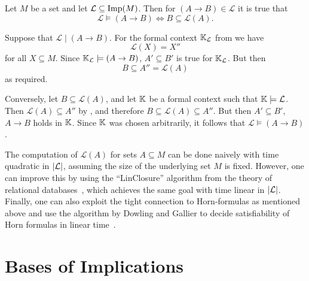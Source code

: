 \begin{Lemma}
  \label{lem:characterization-of-entailment-in-terms-of-induced-closure-operators}
  Let $M$ be a set and let $\mathcal{L} \subseteq \operatorname{Imp}(M)$.  Then for $(A \to B) \in
  \mathcal{L}$ it is true that
  \begin{equation}
    \label{eq:7}
    \mathcal{L} \models (A \to B) \iff B \subseteq \mathcal{L}(A).
  \end{equation}
\end{Lemma}
\begin{Proof}
  Suppose that $\mathcal{L} \mid (A \to B)$.  For the formal context ${\mathbb{K}}_{\mathcal{L}}$ from  we have
  \begin{equation*}
    \mathcal{L}(X) = X''
  \end{equation*}
  for all $X \subseteq M$.  Since ${\mathbb{K}}_{\mathcal{L}} \models (A \to B)$, $A' \subseteq
  B'$ is true for ${\mathbb{K}}_{\mathcal{L}}$.  But then
  \begin{equation*}
    B \subseteq A'' = \mathcal{L}(A)
  \end{equation*}
  as required.

  Conversely, let $B \subseteq \mathcal{L}(A)$, and let ${\mathbb{K}}$ be a formal context such
  that ${\mathbb{K}} \models \mathcal{L}$.  Then $\mathcal{L}(A) \subseteq A''$ by
  , and therefore $B
  \subseteq \mathcal{L}(A) \subseteq A''$.  But then $A' \subseteq B'$, \ie $A \to B$
  holds in ${\mathbb{K}}$.  Since ${\mathbb{K}}$ was chosen arbitrarily, it follows that $\mathcal{L}
  \models (A \to B)$.  
\end{Proof}

The computation of $\mathcal{L}(A)$ for sets $A \subseteq M$ can be done naively with time
quadratic in $\lvert\mathcal{L}\rvert$, assuming the size of the underlying set $M$ is fixed.
However, one can improve this by using the ``LinClosure'' algorithm from the theory of
relational databases~\cite{DBLP:books/cs/Maier83}, which achieves the same goal with time
linear in $\lvert\mathcal{L}\rvert$.  Finally, one can also exploit the tight connection to
Horn-formulas as mentioned above and use the algorithm by Dowling and Gallier to decide
satisfiability of Horn formulas in linear time~\cite{DBLP:journals/jlp/DowlingG84}.

\section{Bases of Implications}
\label{sec:bases-implications}

